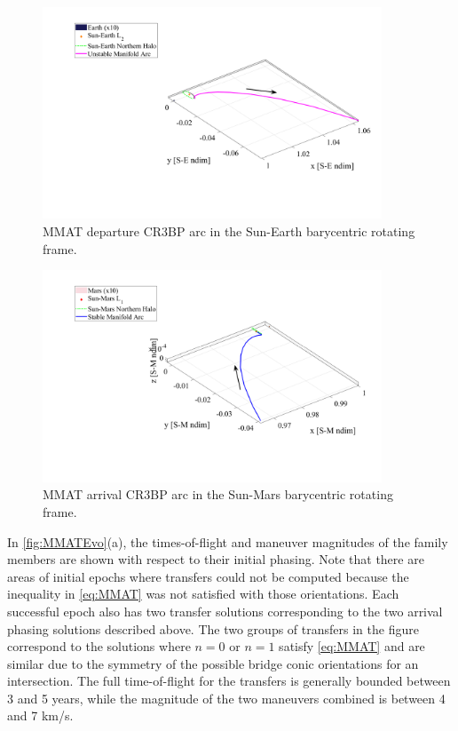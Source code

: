 \begin{figure}[ht]
    \centering
    \includegraphics[width=0.9\textwidth]{figures/MinDvSE.pdf}
    \caption{MMAT departure CR3BP arc in the Sun-Earth barycentric rotating frame.}
    \label{fig:MMATSE}
\end{figure}

\begin{figure}[ht]
    \centering
    \includegraphics[width=0.9\textwidth]{figures/MinDvSM.pdf}
    \caption{MMAT arrival CR3BP arc in the Sun-Mars barycentric rotating frame.}
    \label{fig:MMATSM}
\end{figure}

In \cref{fig:MMATEvo}(a), the times-of-flight and maneuver magnitudes of the family members are
shown with respect to their initial phasing. Note that there are areas of initial epochs where
transfers could not be computed because the inequality in \cref{eq:MMAT} was not satisfied with
those orientations. Each successful epoch also has two transfer solutions corresponding to the two
arrival phasing solutions described above. The two groups of transfers in the figure correspond to 
the solutions where $n=0$ or $n=1$ satisfy \cref{eq:MMAT} and are similar due to the symmetry of
the possible bridge conic orientations for an intersection. The full time-of-flight for the
transfers is generally bounded between 3 and 5 years, while the magnitude of the two maneuvers
combined is between 4 and 7 km/s.

